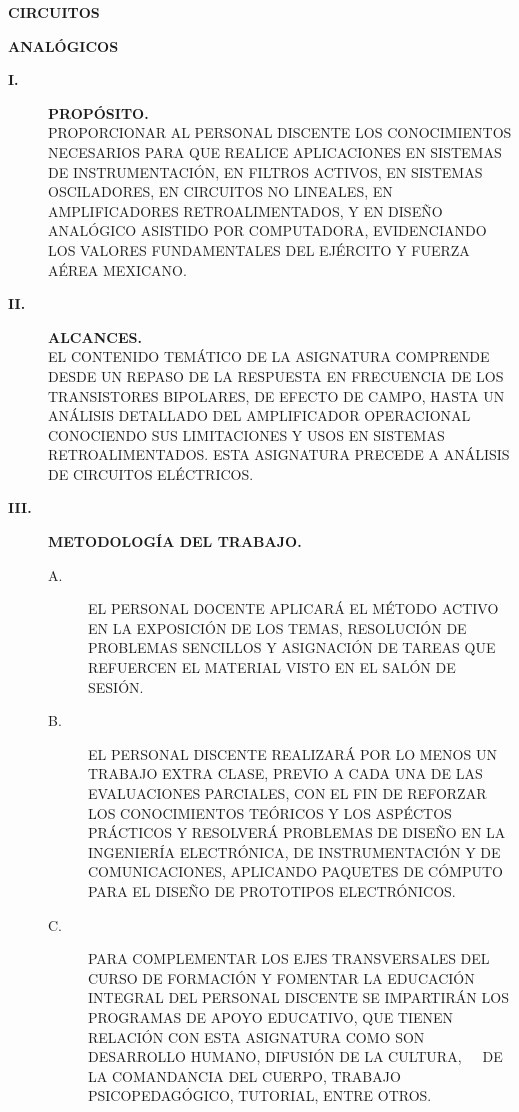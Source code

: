 \documentclass{myarticle}
\begin{document}
\begin{center}{\huge{\bf CIRCUITOS}}\end{center}
\begin{center}{\huge{\bf ANALÓGICOS}}\end{center}

\begin{description}
\item[{\large{\bf I.}}]{\large{\bf PROPÓSITO.}}\\
PROPORCIONAR AL PERSONAL DISCENTE LOS CONOCIMIENTOS NECESARIOS PARA QUE REALICE APLICACIONES EN SISTEMAS DE INSTRUMENTACIÓN, EN FILTROS ACTIVOS, EN SISTEMAS OS\-CI\-LA\-DO\-RES, EN CIRCUITOS NO LINEALES, EN AMPLIFICADORES RE\-TROA\-LI\-MEN\-TA\-DOS, Y EN DISEÑO ANALÓGICO ASISTIDO 
POR COMPUTADORA, EVIDENCIANDO LOS VALORES FUNDAMENTALES DEL E\-JÉR\-CI\-TO Y FUERZA AÉREA MEXICANO.
\item[{\large{\bf II.}}]{\large{\bf ALCANCES.}}\\
EL CONTENIDO TEMÁTICO DE LA ASIGNATURA COMPRENDE DESDE UN REPASO DE LA RESPUESTA EN FRECUENCIA DE LOS TRANSISTORES BIPOLARES, DE EFECTO DE CAMPO, HASTA UN ANÁLISIS DETALLADO DEL AMPLIFICADOR OPERACIONAL CONOCIENDO SUS LIMITACIONES Y USOS EN SISTEMAS RE\-TRO\-A\-LI\-MEN\-TA\-DOS. ESTA 
ASIGNATURA PRECEDE A ANÁLISIS DE CIRCUITOS ELÉCTRICOS.
\item[{\large{\bf III.}}]{\large{\bf  METODOLOGÍA DEL TRABAJO.}}\\
\begin{description}
\item[A.]EL PERSONAL DOCENTE APLICARÁ EL MÉTODO ACTIVO EN LA EXPOSICIÓN DE LOS TEMAS, RESOLUCIÓN DE PROBLEMAS SENCILLOS Y ASIGNACIÓN DE TAREAS QUE RE\-FUER\-CEN EL MATERIAL VISTO EN EL SALÓN DE SESIÓN.
\item[B.]EL PERSONAL DISCENTE REALIZARÁ POR LO MENOS UN TRABAJO EXTRA CLA\-SE, PREVIO A CADA UNA DE LAS EVALUACIONES PARCIALES, CON EL FIN DE REFORZAR LOS CONOCIMIENTOS TEÓRICOS Y LOS ASPÉCTOS PRÁCTICOS Y RESOLVERÁ PROBLEMAS DE DISEÑO EN LA INGENIERÍA ELECTRÓNICA, DE INSTRUMENTACIÓN Y DE COMUNICACIONES, APLICANDO PAQUETES DE CÓMPUTO PARA EL DISEÑO DE PROTOTIPOS ELECTRÓNICOS.
\item[C.]PARA COMPLEMENTAR LOS EJES TRANSVERSALES DEL CUR\-SO DE FORMACIÓN Y FOMENTAR LA EDUCACIÓN INTEGRAL DEL PERSONAL DISCENTE SE IMPARTIRÁN LOS PROGRAMAS DE APOYO EDUCATIVO, QUE TIENEN RELACIÓN CON ESTA ASIGNATURA COMO SON DESARROLLO HUMANO, DIFUSIÓN DE LA CULTURA,\ \ \ DE LA COMANDANCIA DEL CUER\-PO, TRABAJO PSICOPEDAGÓGICO, TUTORIAL, ENTRE OTROS.

\end{description}
\end{description}
\end{document}
